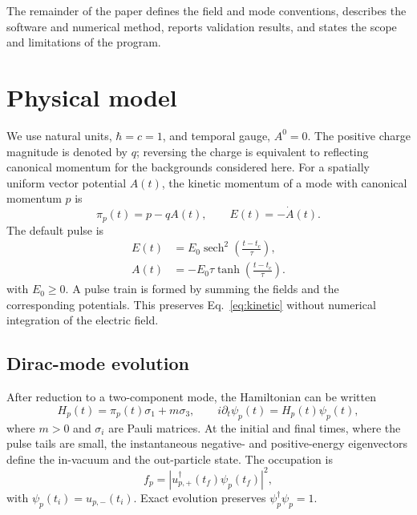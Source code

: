\documentclass[a4paper,fleqn]{cas-dc}
\newcommand{\sech}{\operatorname{sech}}
\begin{document}
The remainder of the paper defines the field and mode conventions, describes the software and numerical method, reports validation results, and states the scope and limitations of the program.

\section{Physical model}
\label{sec:model}

We use natural units, $\hbar=c=1$, and temporal gauge, $A^0=0$. The positive charge magnitude is denoted by $q$; reversing the charge is equivalent to reflecting canonical momentum for the backgrounds considered here. For a spatially uniform vector potential $A(t)$, the kinetic momentum of a mode with canonical momentum $p$ is
\begin{equation}
  \pi_p(t)=p-qA(t), \qquad E(t)=-\dot A(t).
  \label{eq:kinetic}
\end{equation}
The default pulse is
\begin{align}
  E(t)&=E_0\sech^2\!\left(\frac{t-t_c}{\tau}\right),\nonumber\\
  A(t)&=-E_0\tau\tanh\!\left(\frac{t-t_c}{\tau}\right).
  \label{eq:sauter}
\end{align}
with $E_0\geq0$. A pulse train is formed by summing the fields and the corresponding potentials. This preserves Eq.~\eqref{eq:kinetic} without numerical integration of the electric field.

\subsection{Dirac-mode evolution}

After reduction to a two-component mode, the Hamiltonian can be written
\begin{equation}
  H_p(t)=\pi_p(t)\sigma_1+m\sigma_3, \qquad
  i\partial_t\psi_p(t)=H_p(t)\psi_p(t),
  \label{eq:dirac}
\end{equation}
where $m>0$ and $\sigma_i$ are Pauli matrices. At the initial and final times, where the pulse tails are small, the instantaneous negative- and positive-energy eigenvectors define the in-vacuum and the out-particle state. The occupation is
\begin{equation}
  f_p=\left|u_{p,+}^{\dagger}(t_f)\psi_p(t_f)\right|^2,
  \label{eq:occupation}
\end{equation}
with $\psi_p(t_i)=u_{p,-}(t_i)$. Exact evolution preserves $\psi_p^\dagger\psi_p=1$.
\end{document}

